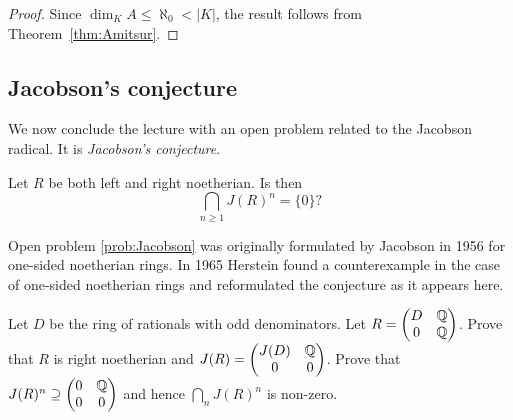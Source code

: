 \begin{proof}
Since $\dim_K A\leq\aleph_0<|K|$, the result follows from Theorem~\ref{thm:Amitsur}.
\end{proof}

\begin{optional} 
\section{Jacobson's conjecture}

We now conclude the lecture
with an open problem related to the Jacobson radical. It is  
\emph{Jacobson's conjecture}. 

\begin{open}[Jacobson]
\label{prob:Jacobson}
Let $R$ be 
both left and right noetherian. Is then 
\[
\bigcap_{n\geq1}J(R)^n=\{0\}?
\]
\end{open}

Open problem \ref{prob:Jacobson} was originally formulated by Jacobson in 1956 \cite{MR0222106} 
for one-sided noetherian rings. In 1965 Herstein \cite{MR188253} found a counterexample
in the case of one-sided noetherian rings 
and reformulated the conjecture as it appears here. 

\begin{xca}[Herstein]
Let $D$ be the ring of rationals with odd denominators. Let
$R=\begin{pmatrix}
    D & \mathbb{Q}\\
    0 & \mathbb{Q}
\end{pmatrix}$. Prove that $R$ is right noetherian and 
$J(R)=\begin{pmatrix}
J(D) & \mathbb{Q}\\
0 & 0
\end{pmatrix}$. Prove that 
$J(R)^n\supseteq\begin{pmatrix}0&\mathbb{Q}\\0&0\end{pmatrix}$ and hence $\bigcap_nJ(R)^n$ is non-zero. 
\end{xca}
\end{optional}

